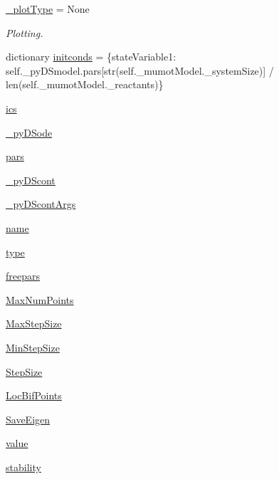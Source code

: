 \begin{DoxyCompactItemize}
\item 
\hyperlink{namespace_mu_mo_t_a5feff4ca83ee97d6e09874496a4975d4}{\+\_\+plot\+Type} = None
\begin{DoxyCompactList}\small\item\em Plotting. \end{DoxyCompactList}\item 
dictionary \hyperlink{namespace_mu_mo_t_a23ca095d6146b220be161f1f73017674}{initconds} = \{state\+Variable1\+: self.\+\_\+py\+D\+Smodel.\+pars\mbox{[}str(self.\+\_\+mumot\+Model.\+\_\+system\+Size)\mbox{]} / len(self.\+\_\+mumot\+Model.\+\_\+reactants)\}
\item 
\hyperlink{namespace_mu_mo_t_a08c7b0edb053705a8c47fe487b6f53bd}{ics}
\item 
\hyperlink{namespace_mu_mo_t_a45f0a60363e440604d8e5b08930eb7b5}{\+\_\+py\+D\+Sode}
\item 
\hyperlink{namespace_mu_mo_t_a372cc7d4f485e77e35668d40b507d0e5}{pars}
\item 
\hyperlink{namespace_mu_mo_t_a797e92fe19ce2636a49bf1400a69fc49}{\+\_\+py\+D\+Scont}
\item 
\hyperlink{namespace_mu_mo_t_aa56e2cffc879be68fdec55f29334415c}{\+\_\+py\+D\+Scont\+Args}
\item 
\hyperlink{namespace_mu_mo_t_ab74e6bf80237ddc4109968cedc58c151}{name}
\item 
\hyperlink{namespace_mu_mo_t_a7aead736a07eaf25623ad7bfa1f0ee2d}{type}
\item 
\hyperlink{namespace_mu_mo_t_a15cf90b3888db001a8299a477d50af98}{freepars}
\item 
\hyperlink{namespace_mu_mo_t_aaa677c130e36435865b68ff6230a932d}{Max\+Num\+Points}
\item 
\hyperlink{namespace_mu_mo_t_a0a7557ffe670b6a318afa8bd9851d2fc}{Max\+Step\+Size}
\item 
\hyperlink{namespace_mu_mo_t_a5fe506ca005e76a55ccd505a36e17fe6}{Min\+Step\+Size}
\item 
\hyperlink{namespace_mu_mo_t_a9c25479455e9bdd389f37c4bccfefea1}{Step\+Size}
\item 
\hyperlink{namespace_mu_mo_t_a7ff5325c1fceeebd63c3e4805a2206c8}{Loc\+Bif\+Points}
\item 
\hyperlink{namespace_mu_mo_t_a040a7ecbcbaca807aeaec6d5c81801d5}{Save\+Eigen}
\item 
\hyperlink{namespace_mu_mo_t_afcc7a4b78ecd8fa7e713f8cfa0f51017}{value}
\item 
\hyperlink{namespace_mu_mo_t_a1df8fcdacfec00fc258a3c72772c2f18}{stability}

\end{DoxyCompactItemize}

